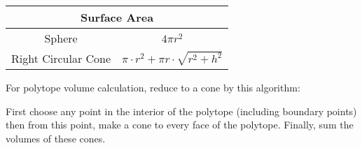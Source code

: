 \noindent
\begin{tabular}{|c|c|}
    \hline
    \multicolumn{2}{|c|}{Surface Area}\\\hline
    Sphere & $4 \pi r^2$\\\hline
    Right Circular Cone & $\pi\cdot r^2+\pi r \cdot \sqrt{r^2+h^2}$\\\hline
\end{tabular}

For polytope volume calculation, reduce to a cone by this algorithm:

First choose any point in the interior of the polytope (including boundary points) then from this point, make a cone to every face of the polytope. Finally, sum the volumes of these cones.


